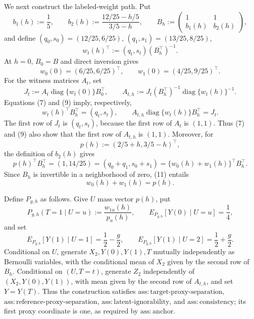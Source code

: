 We next construct the labeled-weight path.  Put
\[
 b_1(h):=\frac15,
 \qquad
 b_2(h):=\frac{12/25-h/5}{3/5-h},
 \qquad
 B_h:=\begin{pmatrix}1&1\\ b_1(h)&b_2(h)\end{pmatrix},                            \tag{6}
\]
and define \((q_0,s_0)=(12/25,6/25)\), \((q_1,s_1)=(13/25,8/25)\),
\[
 w_t(h)^\top:=(q_t,s_t)(B_h^\top)^{-1}.                                           \tag{7}
\]
At \(h=0\), \(B_0=B\) and direct inversion gives
\[
 w_0(0)=(6/25,6/25)^\top,
 \qquad
 w_1(0)=(4/25,9/25)^\top.                                                         \tag{8}
\]
For the witness matrices \(A_t\), set
\[
 J_t:=A_t\operatorname{diag}\{w_t(0)\}B_0^\top,
 \qquad
 A_{t,h}:=J_t(B_h^\top)^{-1}\operatorname{diag}\{w_t(h)\}^{-1}.                  \tag{9}
\]
Equations (7) and (9) imply, respectively,
\[
 w_t(h)^\top B_h^\top=(q_t,s_t),
 \qquad
 A_{t,h}\operatorname{diag}\{w_t(h)\}B_h^\top=J_t.                              \tag{10}
\]
The first row of \(J_t\) is \((q_t,s_t)\), because the first row of \(A_t\) is \((1,1)\).  Thus (7) and (9) also show that the first row of \(A_{t,h}\) is \((1,1)\).  Moreover, for
\[
 p(h):=(2/5+h,3/5-h)^\top,
\]
the definition of \(b_2(h)\) gives
\[
 p(h)^\top B_h^\top=(1,14/25)
 =(q_0+q_1,s_0+s_1)
 =\{w_0(h)+w_1(h)\}^\top B_h^\top.                                               \tag{11}
\]
Since \(B_h\) is invertible in a neighborhood of zero, (11) entails
\[
 w_0(h)+w_1(h)=p(h).                                                               \tag{12}
\]

Define \(P_{g,h}\) as follows.  Give \(U\) mass vector \(p(h)\), put
\[
 P_{g,h}(T=1\mid U=u):=\frac{w_{1u}(h)}{p_u(h)},
 \qquad
 E_{P_{g,h}}[Y(0)\mid U=u]=\frac14,                                                \tag{13}
\]
and set
\[
 E_{P_{g,h}}[Y(1)\mid U=1]=\frac12-\frac g2,
 \qquad
 E_{P_{g,h}}[Y(1)\mid U=2]=\frac12+\frac g2.                                     \tag{14}
\]
Conditional on \(U\), generate \(X_2,Y(0),Y(1),T\) mutually independently as Bernoulli variables, with the conditional mean of \(X_2\) given by the second row of \(B_h\).  Conditional on \((U,T=t)\), generate \(Z_2\) independently of \((X_2,Y(0),Y(1))\), with mean given by the second row of \(A_{t,h}\), and set \(Y=Y(T)\).  Thus the construction satisfies \(\mathrm{ass:target\text{-}proxy\text{-}separation}\), \(\mathrm{ass:reference\text{-}proxy\text{-}separation}\), \(\mathrm{ass:latent\text{-}ignorability}\), and \(\mathrm{ass:consistency}\); its first proxy coordinate is one, as required by \(\mathrm{ass:anchor}\).

